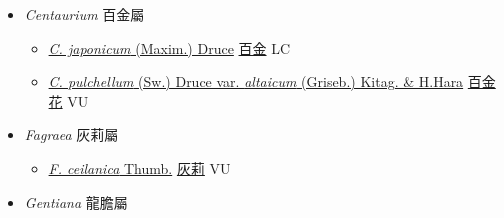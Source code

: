 
  \begin{itemize}
 \item[] \textit{Centaurium} 百金屬
                    
  \begin{itemize}
        \item[] \href{http://www.theplantlist.org/tpl1.1/search?q=Centaurium+japonicum}{\textit{C. japonicum} (Maxim.) Druce}   \href{\detokenize{http://taibnet.sinica.edu.tw/chi/taibnet_species_list.php?T2=百金&T2_new_value=true&fr=y}}{百金} LC
        \item[] \href{http://www.theplantlist.org/tpl1.1/search?q=Centaurium+pulchellum+var.+altaicum}{\textit{C. pulchellum} (Sw.) Druce var. \textit{altaicum} (Griseb.) Kitag. \& H.Hara}   \href{\detokenize{http://taibnet.sinica.edu.tw/chi/taibnet_species_list.php?T2=百金花&T2_new_value=true&fr=y}}{百金花} VU
  \end{itemize}
 \item[] \textit{Fagraea} 灰莉屬
                    
  \begin{itemize}
        \item[] \href{http://www.theplantlist.org/tpl1.1/search?q=Fagraea+ceilanica}{\textit{F. ceilanica} Thumb.}   \href{\detokenize{http://taibnet.sinica.edu.tw/chi/taibnet_species_list.php?T2=灰莉&T2_new_value=true&fr=y}}{灰莉} VU
  \end{itemize}
 \item[] \textit{Gentiana} 龍膽屬
                    

\end{itemize}
